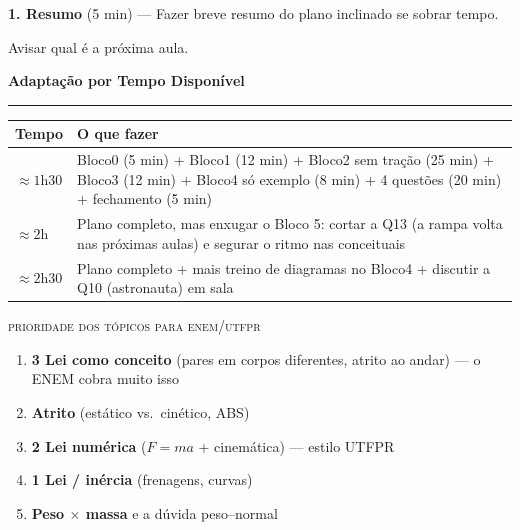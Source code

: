 \documentclass[11pt,a4paper]{article}
\newcommand{\secao}[1]{%
  \needspace{6\baselineskip}
  \vspace{1.8em}
  {\Large\bfseries #1}\\[-0.55em]
  {\color{black!30}\rule{\linewidth}{0.5pt}}
  \par\nobreak\smallskip
}
\begin{document}
\begin{quadro}
\textbf{1. Resumo} (5 min) --- Fazer breve resumo do plano inclinado se sobrar tempo.


\end{quadro}

\begin{obs}
Avisar qual \'e a pr\'oxima aula.
\end{obs}

\secao{Adapta\c{c}\~ao por Tempo Dispon\'ivel}

{\renewcommand{\arraystretch}{1.5}
\begin{tabularx}{\linewidth}{@{}lX@{}}
  \toprule
  \textbf{Tempo} & \textbf{O que fazer} \\
  \midrule
  $\approx 1$h30 &
    Bloco0 (5 min) + Bloco1 (12 min) + Bloco2 sem tra\c{c}\~ao (25 min) +
    Bloco3 (12 min) + Bloco4 s\'o exemplo (8 min) + 4 quest\~oes (20 min) +
    fechamento (5 min) \\
  $\approx 2$h &
    Plano completo, mas enxugar o Bloco 5: cortar a Q13 (a rampa volta
    nas pr\'oximas aulas) e segurar o ritmo nas conceituais \\
  $\approx 2$h30 &
    Plano completo + mais treino de diagramas no Bloco4 +
    discutir a Q10 (astronauta) em sala \\
  \bottomrule
\end{tabularx}}

\bigskip

{\scshape\color{vinho}prioridade dos t\'opicos para enem/utfpr}
\begin{enumerate}[nosep]
  \item \textbf{3\textordfeminine{} Lei como conceito} (pares em corpos
        diferentes, atrito ao andar) --- o ENEM cobra muito isso
  \item \textbf{Atrito} (est\'atico vs.\ cin\'etico, ABS)
  \item \textbf{2\textordfeminine{} Lei num\'erica} ($F=ma$ +
        cinem\'atica) --- estilo UTFPR
  \item \textbf{1\textordfeminine{} Lei / in\'ercia} (frenagens, curvas)
  \item \textbf{Peso $\times$ massa} e a d\'uvida peso--normal
\end{enumerate}
\end{document}
